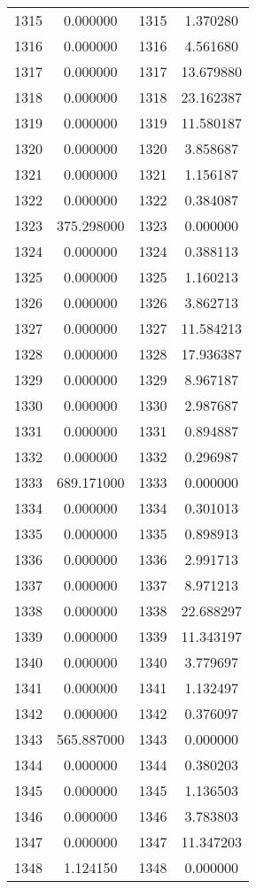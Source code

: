 \documentclass[12pt]{article}
\begin{document}
\begin{longtable}{@{}cccc@{}}
1315 & 0.000000 & 1315 & 1.370280 \\
1316 & 0.000000 & 1316 & 4.561680 \\
1317 & 0.000000 & 1317 & 13.679880 \\
1318 & 0.000000 & 1318 & 23.162387 \\
1319 & 0.000000 & 1319 & 11.580187 \\
1320 & 0.000000 & 1320 & 3.858687 \\
1321 & 0.000000 & 1321 & 1.156187 \\
1322 & 0.000000 & 1322 & 0.384087 \\
1323 & 375.298000 & 1323 & 0.000000 \\
1324 & 0.000000 & 1324 & 0.388113 \\
1325 & 0.000000 & 1325 & 1.160213 \\
1326 & 0.000000 & 1326 & 3.862713 \\
1327 & 0.000000 & 1327 & 11.584213 \\
1328 & 0.000000 & 1328 & 17.936387 \\
1329 & 0.000000 & 1329 & 8.967187 \\
1330 & 0.000000 & 1330 & 2.987687 \\
1331 & 0.000000 & 1331 & 0.894887 \\
1332 & 0.000000 & 1332 & 0.296987 \\
1333 & 689.171000 & 1333 & 0.000000 \\
1334 & 0.000000 & 1334 & 0.301013 \\
1335 & 0.000000 & 1335 & 0.898913 \\
1336 & 0.000000 & 1336 & 2.991713 \\
1337 & 0.000000 & 1337 & 8.971213 \\
1338 & 0.000000 & 1338 & 22.688297 \\
1339 & 0.000000 & 1339 & 11.343197 \\
1340 & 0.000000 & 1340 & 3.779697 \\
1341 & 0.000000 & 1341 & 1.132497 \\
1342 & 0.000000 & 1342 & 0.376097 \\
1343 & 565.887000 & 1343 & 0.000000 \\
1344 & 0.000000 & 1344 & 0.380203 \\
1345 & 0.000000 & 1345 & 1.136503 \\
1346 & 0.000000 & 1346 & 3.783803 \\
1347 & 0.000000 & 1347 & 11.347203 \\
1348 & 1.124150 & 1348 & 0.000000 \\

\end{longtable}
\end{document}
